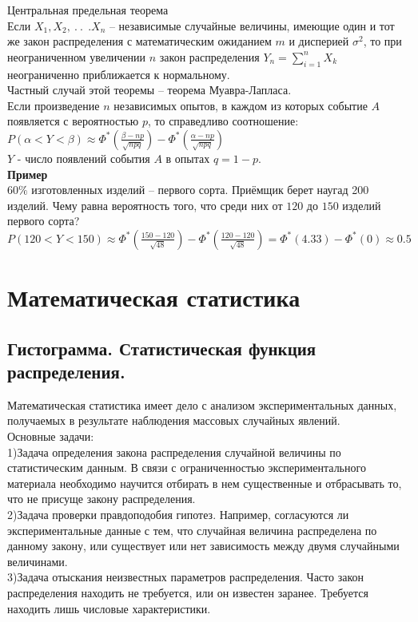 \documentclass[russian, 12pt, fleqn]{article}
\begin{document}
$\textbf{Центральная предельная теорема}$\\
Если $X_1,$$ X_2,\ .\ .\ \ . X_n$ -- независимые случайные  величины, имеющие один и тот же закон распределения с математическим ожиданием $m$ и дисперией $\sigma^2$,
то при неограниченном увеличении $n$ закон распределения $Y_n = \displaystyle{\sum\limits_{i = 1}^{n}} X_k$ неограниченно приближается к нормальному.\\
Частный случай этой теоремы -- теорема Муавра-Лапласа.\\
Если произведение $n$ независимых опытов, в каждом из которых событие $A$ появляется с вероятностью $p$, то справедливо соотношение:
\\ $P(\alpha < Y < \beta) \approx \Phi^*(\frac{\beta - np}{\sqrt{npq}}) - \Phi^*(\frac{\alpha - np}{\sqrt{npq}})$\\
$Y$ - число появлений события $A$  в опытах $q = 1 - p$.\\
\textbf{Пример} \\
$60 \%$ изготовленных изделий -- первого сорта. Приёмщик берет наугад 200 изделий. Чему равна вероятность того, что среди них от $120$ до $150$ изделий первого сорта?\\
$P(120 < Y < 150) \approx \Phi^*(\frac{150-120}{\sqrt{48}}) - \Phi^*(\frac{120 - 120}{\sqrt{48}}) = \Phi^*(4.33) - \Phi^*(0)  \approx 0.5$ \\
\section{Математическая статистика}
\subsection{Гистограмма. Статистическая функция распределения.}
\noindent
Математическая статистика имеет дело с анализом экспериментальных данных, получаемых в результате наблюдения массовых случайных явлений.\\
Основные задачи:\\
1)Задача определения закона распределения случайной величины по статистическим данным. В связи с ограниченностью 
экспериментального материала необходимо научится отбирать в нем существенные и отбрасывать то, что не присуще закону распределения.\\
2)Задача проверки правдоподобия гипотез. Например, согласуются ли 
экспериментальные данные с тем, что случайная величина распределена по данному закону, или существует или нет зависимость между двумя случайными величинами.\\
3)Задача отыскания неизвестных параметров распределения. Часто закон распределения находить не требуется, или он известен заранее. Требуется находить лишь числовые характеристики.\\
\end{document}
